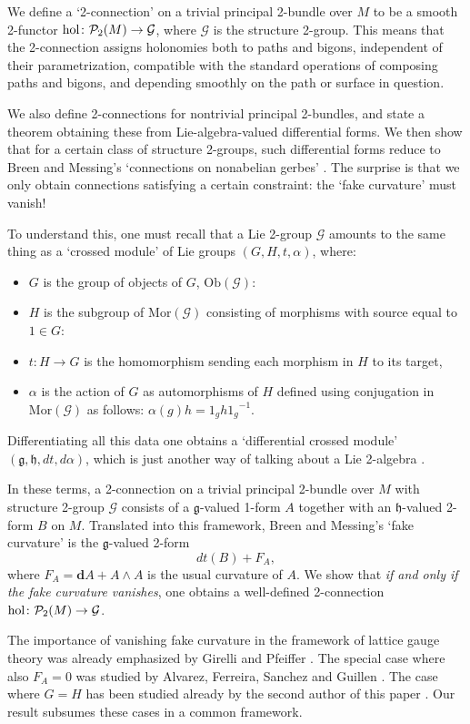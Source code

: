 \documentclass{article}
\newcommand{\maps}{\colon}
\newcommand{\g}{\mathfrak{g}}
\newcommand{\h}{\mathfrak{h}}
\newcommand{\Ob}{\mathrm{Ob}}
\newcommand{\Mor}{\mathrm{Mor}}
\renewcommand{\P}{\mathcal{P}}
\def\hol {{\rm hol}}
\def\twogroup {\mathcal{G}}
\def\G {G}
\def\of #1{\!\left({#1}\right)}
\def\extd {\mathbf{{d}}}
\begin{document}
We define a `2-connection' on a trivial principal 2-bundle 
over $M$ to be a smooth 2-functor $\hol \maps \P_2(M) 
\to \twogroup$, where $\twogroup$ is the structure 2-group.   
This means that the 2-connection assigns holonomies both
to paths and bigons, independent of their parametrization, compatible 
with the standard operations of composing paths and bigons, and 
depending smoothly on the path or surface in question.  

We also define 2-connections for nontrivial principal 2-bundles,
and state a theorem obtaining these from Lie-algebra-valued
differential forms.   We then show that for a certain class of
structure 2-groups, such differential forms reduce to Breen and 
Messing's `connections on nonabelian gerbes' \cite{BreenMessing:2001}.  
The surprise is that we only obtain connections satisfying a 
certain constraint: the `fake curvature' must vanish!

To understand this, one must recall \cite{BaezLauda:2003}
that a Lie 2-group $\twogroup$ amounts to the same thing as 
a `crossed module' of Lie groups $(G,H,t,\alpha)$, where:
\begin{itemize}
\item $G$ is the group of objects of $\G$, $\Ob(\twogroup)$:
\item $H$ is the subgroup of $\Mor(\twogroup)$ consisting
of morphisms with source equal to $1 \in G$:
\item $t \maps H \to G$ is the homomorphism sending each morphism
in $H$ to its target,
\item $\alpha$ is the action of $G$ as automorphisms of $H$ defined
using conjugation in $\Mor(\twogroup)$ as follows: 
$\alpha(g) h = 1_g h {1_g}^{-1}$. 
\end{itemize}
Differentiating all this data one obtains a `differential crossed 
module' $(\g,\h,dt,d\alpha)$, which is just another way of talking
about a Lie 2-algebra \cite{BaezSchreiber:2004}.

In these terms, a 2-connection on a trivial principal 2-bundle over
$M$ with structure 2-group $\twogroup$ consists of a $\g$-valued
1-form $A$ together with an $\h$-valued 2-form $B$ on $M$. Translated
into this framework, Breen and Messing's `fake curvature' is the
$\g$-valued 2-form
\[
dt\of{B} + F_A, 
\]
where $F_A = \extd A + A \wedge A$ is the usual curvature of $A$.
We show that {\it if and only if the fake curvature vanishes}, 
one obtains a well-defined 2-connection $\hol \maps \P_2(M) \to \twogroup$.  

The importance of vanishing fake curvature in the framework of lattice 
gauge theory was already emphasized by Girelli and Pfeiffer
\cite{GirelliPfeiffer:2004}.  The special case where also $F_A = 0$ 
was studied by Alvarez, Ferreira, Sanchez and Guillen
\cite{AlvarezFerreiraSanchezGuillen:1998}.   The case where 
$G = H$ has been studied already by the second author of this
paper \cite{Schreiber:2004e}.  Our result subsumes these 
cases in a common framework.  
\end{document}
